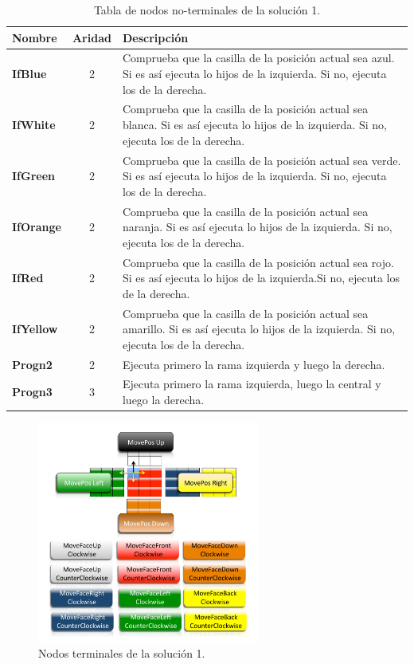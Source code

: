 \begin{table}[t]
\caption{Tabla de nodos no-terminales de la solución 1.}
\label{tab:n-noterminales-sol1}
\centering
\begin{tabular}{lcp{8cm}}
\toprule
\textbf{Nombre}&\textbf{Aridad}& \textbf{Descripción}\\
\midrule
\textbf{IfBlue}&2&	Comprueba que la casilla de la posición actual sea azul. Si
es así ejecuta lo hijos de la izquierda. Si no, ejecuta los de la
derecha.\\\hline
\textbf{IfWhite}&	2& Comprueba que la casilla de la posición actual sea blanca.
Si es así ejecuta lo hijos de la izquierda. Si no, ejecuta los de la
derecha.\\\hline
\textbf{IfGreen}&2& Comprueba que la casilla de la posición actual sea verde.
Si es así ejecuta lo hijos de la izquierda. Si no, ejecuta los de la derecha.
\\\hline
\textbf{IfOrange}&	2&	Comprueba
que la casilla de la posición actual sea naranja. Si es así ejecuta lo hijos de
la izquierda. Si no, ejecuta los de la derecha.\\ \hline
\textbf{IfRed}&	2&	Comprueba que la
casilla de la posición actual sea rojo. Si es así ejecuta lo hijos de la
izquierda.Si no, ejecuta los de la derecha.\\\hline
\textbf{IfYellow}&	2&	Comprueba que la
casilla de la posición actual sea amarillo. Si es así ejecuta lo hijos de la
izquierda. Si no, ejecuta los de la derecha. \\\hline
\textbf{Progn2}&	2&	Ejecuta primero la rama
izquierda y luego la derecha.\\\hline
\textbf{Progn3}&	3&	Ejecuta primero la rama izquierda,
luego la central y luego la derecha.\\
\bottomrule
\end{tabular}
\end{table}


\begin{figure}[t]
\centering
\includegraphics[width=0.65\textwidth]{figs/pdf/leng1nodosterm}
\caption{Nodos terminales de la solución 1.}
\label{fig:leng1nodosterm}
\end{figure}

